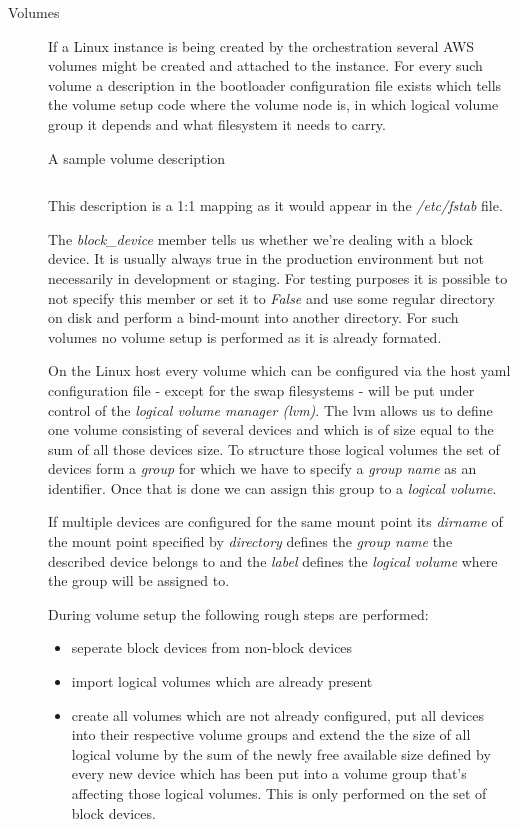 			\begin{description}
				\item[Volumes] If a Linux instance is being created by the orchestration several AWS volumes might be created and attached to the instance. For every such volume a description in the bootloader configuration file exists which tells the volume setup code where the volume node is, in which logical volume group it depends and what filesystem it needs to carry.
				\begin{listing}[H]
					\caption{A sample volume description}
					\label{lst:p01:ch01:linhost_vol_desc}
					\inputminted{yaml}{\relative{chapter_01/section_3.2/volume_description_example.yaml}}
				\end{listing}
				This description is a 1:1 mapping as it would appear in the \emph{/etc/fstab} file.
			
				The \emph{block\_device} member tells us whether we're dealing with a block device. It is usually always true in the 			production environment but not necessarily in development or staging. For testing purposes it is possible to not specify this member or set it to \emph{False} and use some regular directory on disk and perform a bind-mount into another directory. For such volumes no volume setup is performed as it is already formated.
			
				On the Linux host every volume which can be configured via the host yaml configuration file - except for the swap filesystems - will be put under control of the \emph{logical volume manager (lvm)}. The lvm allows us to define one volume consisting of several devices and which is of size equal to the sum of all those devices size. To structure those logical volumes the set of devices form a \emph{group} for which we have to specify a \emph{group name} as an identifier. Once that is done we can assign this group to a \emph{logical volume}.
			 
				If multiple devices are configured for the same mount point its \emph{dirname} of the mount point specified by \emph{directory} defines the \emph{group name} the described device belongs to and the \emph{label} defines the \emph{logical volume} where the group will be assigned to.
			
				During volume setup the following rough steps are performed:
				\begin{itemize}
					\item seperate block devices from non-block devices
					\item import logical volumes which are already present
					\item create all volumes which are not already configured, put all devices into their respective volume groups and extend the the size of all logical volume by the sum of the newly free available size defined by every new device which has been put into a volume group that's affecting those logical volumes. This is only performed on the set of block devices.
				\end{itemize}
			

\end{description}
